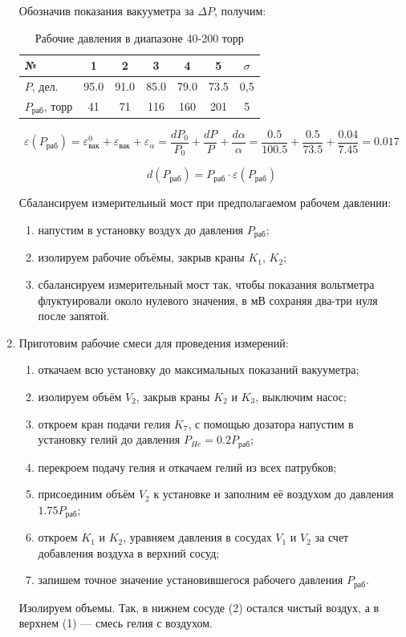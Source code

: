 \documentclass[a4paper,12pt]{article} %
\begin{document}
\begin{enumerate}
  Обозначив показания вакууметра за $\Delta P$, получим:
  
  \begin{table}[h!]
    \begin{tabular}{|l|c|c|c|c|c|c|}
      \hline
      № & 1 & 2 & 3 & 4 & 5 & $\sigma$ \\
      \hline 
      $P$, дел. & 95.0 & 91.0 & 85.0 & 79.0 & 73.5& 0,5 \\ 
      $P_{\text{раб}}$, торр & 41 & 71 & 116 & 160 & 201 & 5\\
      \hline    
    \end{tabular}
    \caption{Рабочие давления в диапазоне 40-200 торр}
    \label{tab:P}
  \end{table}
  
  \begin{equation}
    \varepsilon(P_\text{раб}) = \varepsilon_{\text{вак}}^0 + \varepsilon_{\text{вак}} + \varepsilon_{\alpha} = \frac{d P_0}{P_0} + \frac{d P}{P} + \frac{d \alpha}{\alpha} = \frac{0.5}{100.5} + \frac{0.5}{73.5} + \frac{0.04}{7.45} = 0.017 
  \end{equation}

  \begin{equation}
    d(P_\text{раб}) = P_\text{раб} \cdot \varepsilon(P_\text{раб}) 
  \end{equation}
  
  
  Сбалансируем измерительный мост при предполагаемом рабочем давлении:
  \begin{enumerate}
    \item напустим в установку воздух до давления $P_\text{раб}$;
    \item изолируем рабочие объёмы, закрыв краны $K_1$, $K_2$;
    \item сбалансируем измерительный мост так, чтобы показания вольтметра флуктуировали около нулевого значения, в мВ сохраняя два-три нуля после запятой.
  \end{enumerate}
  
  \item Приготовим рабочие смеси для проведения измерений:
  \begin{enumerate}
    \item откачаем всю установку до максимальных показаний вакууметра;
    \item изолируем объём $V_2$, закрыв краны $K_2$ и $K_3$, выключим насос;
    \item откроем кран подачи гелия $K_7$, с помощью дозатора напустим в установку гелий до давления $P_{He} = 0.2 P_\text{раб}$;
    \item перекроем подачу гелия и откачаем гелий из всех патрубков;
    \item присоединим объём $V_2$ к установке и заполним её воздухом до давления $1.75 P_\text{раб}$;
    \item откроем $K_1$ и $K_2$, уравняем давления в сосудах $V_1$ и $V_2$ за счет добавления воздуха в верхний сосуд;
    \item запишем точное значение установившегося рабочего давления $P_\text{раб}$.
  \end{enumerate}
  Изолируем объемы. Так, в нижнем сосуде (2) остался чистый воздух, а в верхнем (1) — смесь гелия с воздухом.
  

\end{enumerate}
\end{document}
